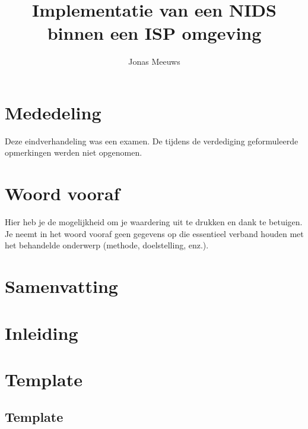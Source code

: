\documentclass[a4paper, 12pt]{report}
\title{Implementatie van een NIDS binnen een ISP omgeving}
\author{Jonas Meeuws}
\begin{document}
\maketitle
%

\newpage
\thispagestyle{empty}
\mbox{}

\maketitle
%

\chapter*{Mededeling}
Deze eindverhandeling was een examen.
De tijdens de verdediging geformuleerde opmerkingen werden niet opgenomen.

\chapter*{Woord vooraf}
Hier heb je de mogelijkheid om je waardering uit te drukken en dank te betuigen. Je neemt in
het woord vooraf geen gegevens op die essentieel verband houden met het behandelde
onderwerp (methode, doelstelling, enz.).

\chapter*{Samenvatting}
\blindtext

\tableofcontents
\newpage

\listoffigures

\chapter*{Inleiding}
\blindtext

\chapter{Template}
\section{Template}
\end{document}
